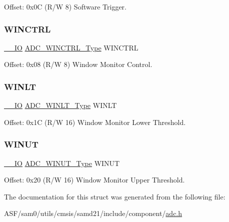 Offset\+: 0x0C (R/W 8) Software Trigger. 

\mbox{\label{struct_adc_af51b5f058c3651b68fa343a3786fffa0}} 
\subsubsection{\texorpdfstring{WINCTRL}{WINCTRL}}
{\footnotesize\ttfamily \mbox{\hyperlink{core__cm0plus_8h_aec43007d9998a0a0e01faede4133d6be}{\+\_\+\+\_\+\+IO}} \mbox{\hyperlink{union_a_d_c___w_i_n_c_t_r_l___type}{A\+D\+C\+\_\+\+W\+I\+N\+C\+T\+R\+L\+\_\+\+Type}} W\+I\+N\+C\+T\+RL}



Offset\+: 0x08 (R/W 8) Window Monitor Control. 

\mbox{\label{struct_adc_a16b5ee670a97f4f8135b6a55ef4751b8}} 
\subsubsection{\texorpdfstring{WINLT}{WINLT}}
{\footnotesize\ttfamily \mbox{\hyperlink{core__cm0plus_8h_aec43007d9998a0a0e01faede4133d6be}{\+\_\+\+\_\+\+IO}} \mbox{\hyperlink{union_a_d_c___w_i_n_l_t___type}{A\+D\+C\+\_\+\+W\+I\+N\+L\+T\+\_\+\+Type}} W\+I\+N\+LT}



Offset\+: 0x1C (R/W 16) Window Monitor Lower Threshold. 

\mbox{\label{struct_adc_affcbbe1dfc4b55c5d6025e051a750fc2}} 
\subsubsection{\texorpdfstring{WINUT}{WINUT}}
{\footnotesize\ttfamily \mbox{\hyperlink{core__cm0plus_8h_aec43007d9998a0a0e01faede4133d6be}{\+\_\+\+\_\+\+IO}} \mbox{\hyperlink{union_a_d_c___w_i_n_u_t___type}{A\+D\+C\+\_\+\+W\+I\+N\+U\+T\+\_\+\+Type}} W\+I\+N\+UT}



Offset\+: 0x20 (R/W 16) Window Monitor Upper Threshold. 



The documentation for this struct was generated from the following file\+:\begin{DoxyCompactItemize}
\item 
A\+S\+F/sam0/utils/cmsis/samd21/include/component/\mbox{\hyperlink{component_2adc_8h}{adc.\+h}}\end{DoxyCompactItemize}
